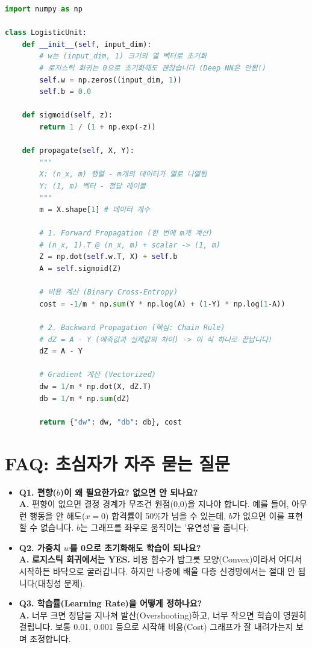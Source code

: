 \documentclass[11pt,a4paper]{book}
\theoremstyle{definition}
\begin{document}
\begin{lstlisting}[language=Python, caption=Vectorized Logistic Regression Unit, breaklines=true]
import numpy as np

class LogisticUnit:
    def __init__(self, input_dim):
        # w는 (input_dim, 1) 크기의 열 벡터로 초기화
        # 로지스틱 회귀는 0으로 초기화해도 괜찮습니다 (Deep NN은 안됨!)
        self.w = np.zeros((input_dim, 1))
        self.b = 0.0

    def sigmoid(self, z):
        return 1 / (1 + np.exp(-z))

    def propagate(self, X, Y):
        """
        X: (n_x, m) 행렬 - m개의 데이터가 열로 나열됨
        Y: (1, m) 벡터 - 정답 레이블
        """
        m = X.shape[1] # 데이터 개수
        
        # 1. Forward Propagation (한 번에 m개 계산)
        # (n_x, 1).T @ (n_x, m) + scalar -> (1, m)
        Z = np.dot(self.w.T, X) + self.b 
        A = self.sigmoid(Z)             
        
        # 비용 계산 (Binary Cross-Entropy)
        cost = -1/m * np.sum(Y * np.log(A) + (1-Y) * np.log(1-A))
        
        # 2. Backward Propagation (핵심: Chain Rule)
        # dZ = A - Y (예측값과 실제값의 차이) -> 이 식 하나로 끝납니다!
        dZ = A - Y
        
        # Gradient 계산 (Vectorized)
        dw = 1/m * np.dot(X, dZ.T)
        db = 1/m * np.sum(dZ)
        
        return {"dw": dw, "db": db}, cost
\end{lstlisting}

\section{FAQ: 초심자가 자주 묻는 질문}

\begin{itemize}
    \item \textbf{Q1. 편향($b$)이 왜 필요한가요? 없으면 안 되나요?} \\
    \textbf{A.} 편향이 없으면 결정 경계가 무조건 원점(0,0)을 지나야 합니다. 예를 들어, 아무런 행동을 안 해도($x=0$) 합격률이 50\%가 넘을 수 있는데, $b$가 없으면 이를 표현할 수 없습니다. $b$는 그래프를 좌우로 움직이는 '유연성'을 줍니다.

    \item \textbf{Q2. 가중치 $w$를 0으로 초기화해도 학습이 되나요?} \\
    \textbf{A.} \textbf{로지스틱 회귀에서는 YES.} 비용 함수가 밥그릇 모양(Convex)이라서 어디서 시작하든 바닥으로 굴러갑니다. 하지만 나중에 배울 다층 신경망에서는 절대 안 됩니다(대칭성 문제).

    \item \textbf{Q3. 학습률(Learning Rate)을 어떻게 정하나요?} \\
    \textbf{A.} 너무 크면 정답을 지나쳐 발산(Overshooting)하고, 너무 작으면 학습이 영원히 걸립니다. 보통 0.01, 0.001 등으로 시작해 비용(Cost) 그래프가 잘 내려가는지 보며 조정합니다.
\end{itemize}
\end{document}
